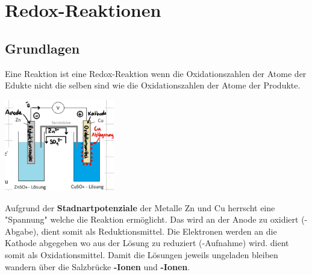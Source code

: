 \section{Redox-Reaktionen}

\subsection{Grundlagen}
Eine Reaktion ist eine Redox-Reaktion wenn die Oxidationszahlen der Atome der Edukte nicht die selben sind wie die Oxidationszahlen der Atome der Produkte.
\begin{center}
    \includegraphics[height=4cm]{pictures/Galv.png}
\end{center}
Aufgrund der \textbf{Stadnartpotenziale} der Metalle Zn und Cu herrscht eine "Spannung" welche die Reaktion ermöglicht. Das \textbf{} wird an der Anode zu \textbf{} oxidiert (-Abgabe), \textbf{} dient somit als Reduktionsmittel. Die Elektronen werden an die Kathode abgegeben wo \textbf{} aus der Lösung zu \textbf{} reduziert (-Aufnahme) wird. \textbf{} dient somit als Oxidationsmittel. Damit die Lösungen jeweils ungeladen bleiben wandern über die Salzbrücke \textbf{-Ionen} und \textbf{-Ionen}.
